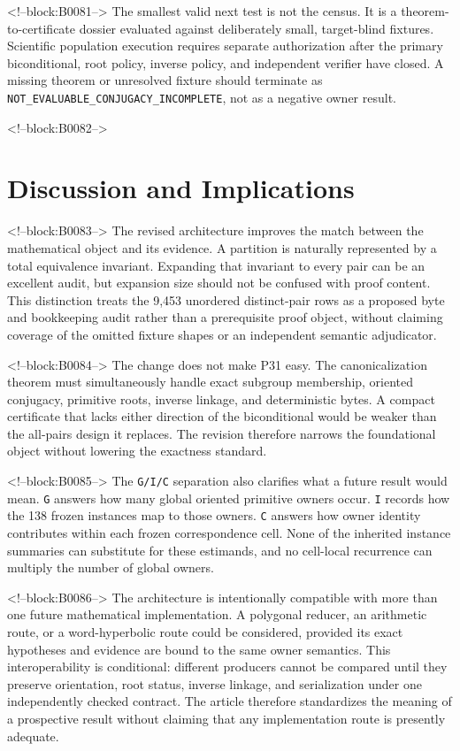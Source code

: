 \documentclass[11pt]{article}
\begin{document}
<!--block:B0081-->
The smallest valid next test is not the census. It is a
theorem-to-certificate dossier evaluated against deliberately small,
target-blind fixtures. Scientific population execution requires separate
authorization after the primary biconditional, root policy, inverse
policy, and independent verifier have closed. A missing theorem or
unresolved fixture should terminate as
\texttt{NOT\_EVALUABLE\_CONJUGACY\_INCOMPLETE}, not as a negative owner
result.

<!--block:B0082-->
\hypertarget{7-discussion-and-implications}{%
\section{Discussion and
Implications}\label{7-discussion-and-implications}}

<!--block:B0083-->
The revised architecture improves the match between the mathematical
object and its evidence. A partition is naturally represented by a total
equivalence invariant. Expanding that invariant to every pair can be an
excellent audit, but expansion size should not be confused with proof
content. This distinction treats the 9,453 unordered distinct-pair rows as a
proposed byte and bookkeeping audit rather than a prerequisite proof
object, without claiming coverage of the omitted fixture shapes or an
independent semantic adjudicator.

<!--block:B0084-->
The change does not make P31 easy. The canonicalization theorem must
simultaneously handle exact subgroup membership, oriented conjugacy,
primitive roots, inverse linkage, and deterministic bytes. A compact
certificate that lacks either direction of the biconditional would be
weaker than the all-pairs design it replaces. The revision therefore
narrows the foundational object without lowering the exactness standard.

<!--block:B0085-->
The \texttt{G/I/C} separation also clarifies what a future result would
mean. \texttt{G} answers how many global oriented primitive owners
occur. \texttt{I} records how the 138 frozen instances map to those
owners. \texttt{C} answers how owner identity contributes within each
frozen correspondence cell. None of the inherited instance summaries can
substitute for these estimands, and no cell-local recurrence can
multiply the number of global owners.

<!--block:B0086-->
The architecture is intentionally compatible with more than one future
mathematical implementation. A polygonal reducer, an arithmetic route,
or a word-hyperbolic route could be considered, provided its exact
hypotheses and evidence are bound to the same owner semantics. This
interoperability is conditional: different producers cannot be compared
until they preserve orientation, root status, inverse linkage, and
serialization under one independently checked contract. The article
therefore standardizes the meaning of a prospective result without
claiming that any implementation route is presently adequate.
\end{document}
